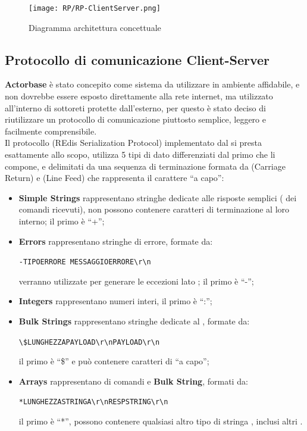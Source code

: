 \documentclass{scalatekids-article}
\begin{document}
\begin{figure}[H]
  \begin{center}
    \texttt{[image: RP/RP-ClientServer.png]}
    \caption{Diagramma architettura concettuale}
  \end{center}
\end{figure}

\subsection{Protocollo di comunicazione Client-Server}
\label{sec:RESP}

\textbf{Actorbase} è stato concepito come sistema da utilizzare in ambiente
affidabile, e non dovrebbe essere esposto direttamente alla rete internet, ma
utilizzato all'interno di sottoreti protette dall'esterno, per questo è stato
deciso di riutilizzare un protocollo di comunicazione
piuttosto semplice, leggero e facilmente comprensibile.\\
Il protocollo  (REdis Serialization Protocol) implementato
dal   si presta esattamente allo scopo, utilizza
5 tipi di dato differenziati dal primo  che li compone, e delimitati
da una sequenza di terminazione formata da  (Carriage Return) e 
(Line Feed) che rappresenta il carattere ``a capo'':
\begin{itemize}
\item \textbf{Simple Strings} rappresentano stringhe dedicate alle risposte
  semplici ( dei comandi ricevuti), non possono contenere caratteri
  di terminazione al loro interno; il primo  è ``+'';
\item \textbf{Errors} rappresentano stringhe di errore, formate da:
  \begin{center}
    \verb=-TIPOERRORE MESSAGGIOERRORE\r\n=
  \end{center}
  verranno utilizzate per generare le eccezioni lato ; il primo  è ``-'';
\item \textbf{Integers} rappresentano numeri interi, il primo  è ``:'';
\item \textbf{Bulk Strings} rappresentano stringhe dedicate al , formate da:
  \begin{center}
    \verb=\$LUNGHEZZAPAYLOAD\r\nPAYLOAD\r\n=
  \end{center}
  il primo  è ``\$'' e può contenere caratteri di ``a capo'';
\item \textbf{Arrays} rappresentano  di comandi e \textbf{Bulk String}, formati da:
  \begin{center}
    \verb=*LUNGHEZZASTRINGA\r\nRESPSTRING\r\n=
  \end{center}
  il primo  è ``*'', possono contenere qualsiasi altro tipo di stringa , inclusi altri .
\end{itemize}
\end{document}
